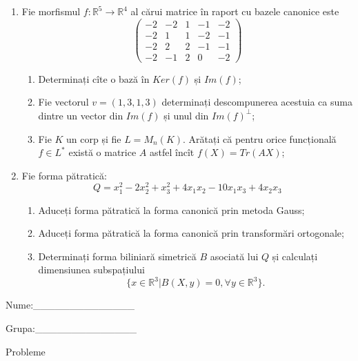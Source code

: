 \documentclass{article}
\begin{document}
\begin{enumerate}
 \item Fie morfismul $f:\mathbb{R}^5 \to \mathbb{R}^4$ al cărui matrice în raport cu bazele canonice este
$$\begin{pmatrix}
-2&-2&1&-1&-2\\
-2&1&1&-2&-1\\
-2&2&2&-1&-1\\
-2&-1&2&0&-2
\end{pmatrix}$$

\begin{enumerate}
\item Determinați cîte o bază în $Ker(f)$ și $Im(f)$;
\item Fie vectorul $v=(1,3,1,3)$ determinați descompunerea acestuia ca suma dintre un vector din $Im(f)$ și unul din $Im(f)^\perp$;
\item Fie $K$ un corp și fie $L=M_n(K)$. Arătați că pentru orice funcțională $f \in L^*$ există o matrice $A$ astfel încît $f(X)=Tr(AX)$;
\end{enumerate}
\item Fie forma pătratică:
$$Q= x_1^2-2x_2^2+x_3^2+4x_1x_2-10x_1x_3+4x_2x_3$$

\begin{enumerate}
\item Aduceți forma pătratică la forma canonică prin metoda Gauss;
\item Aduceți forma pătratică la forma canonică prin transformări ortogonale;
\item Determinați forma biliniară simetrică $B$ asociată lui $Q$ și calculați dimensiunea subspațiului
$$\{x \in \mathbb{R}^3 | B(X,y)=0,\forall y \in \mathbb{R}^3\}.$$

\end{enumerate}
\end{enumerate}
\newpage
\begin{flushright}
Nume:\_\_\_\_\_\_\_\_\_\_\_\_\_\_
 
 
Grupa:\_\_\_\_\_\_\_\_\_\_\_\_\_\_
\end{flushright}
\begin{center}
\vspace{2cm}
{\Large Probleme}
\vspace{2cm}
\end{center}
\end{document}

